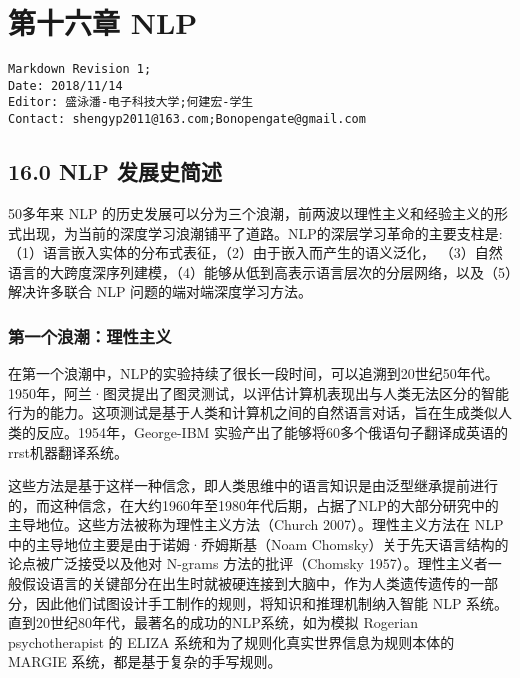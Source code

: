
\chapter{第十六章 NLP}\label{ux7b2cux5341ux516dux7ae0-nlp}

\begin{verbatim}
Markdown Revision 1;
Date: 2018/11/14
Editor: 盛泳潘-电子科技大学;何建宏-学生
Contact: shengyp2011@163.com;Bonopengate@gmail.com
\end{verbatim}

\section{16.0 NLP
发展史简述}\label{nlp-ux53d1ux5c55ux53f2ux7b80ux8ff0}

50多年来 NLP
的历史发展可以分为三个浪潮，前两波以理性主义和经验主义的形式出现，为当前的深度学习浪潮铺平了道路。NLP的深层学习革命的主要支柱是:
（1）语言嵌入实体的分布式表征，（2）由于嵌入而产生的语义泛化，
（3）自然语言的大跨度深序列建模，（4）能够从低到高表示语言层次的分层网络，以及（5）解决许多联合
NLP 问题的端对端深度学习方法。

\subsection{第一个浪潮：理性主义}\label{ux7b2cux4e00ux4e2aux6d6aux6f6eux7406ux6027ux4e3bux4e49}

在第一个浪潮中，NLP的实验持续了很长一段时间，可以追溯到20世纪50年代。1950年，阿兰·图灵提出了图灵测试，以评估计算机表现出与人类无法区分的智能行为的能力。这项测试是基于人类和计算机之间的自然语言对话，旨在生成类似人类的反应。1954年，George-IBM
实验产出了能够将60多个俄语句子翻译成英语的rrst机器翻译系统。

这些方法是基于这样一种信念，即人类思维中的语言知识是由泛型继承提前进行的，而这种信念，在大约1960年至1980年代后期，占据了NLP的大部分研究中的主导地位。这些方法被称为理性主义方法（Church
2007）。理性主义方法在 NLP 中的主导地位主要是由于诺姆·乔姆斯基（Noam
Chomsky）关于先天语言结构的论点被广泛接受以及他对 N-grams
方法的批评（Chomsky
1957）。理性主义者一般假设语言的关键部分在出生时就被硬连接到大脑中，作为人类遗传遗传的一部分，因此他们试图设计手工制作的规则，将知识和推理机制纳入智能
NLP 系统。直到20世纪80年代，最著名的成功的NLP系统，如为模拟 Rogerian
psychotherapist 的 ELIZA 系统和为了规则化真实世界信息为规则本体的 MARGIE
系统，都是基于复杂的手写规则。

